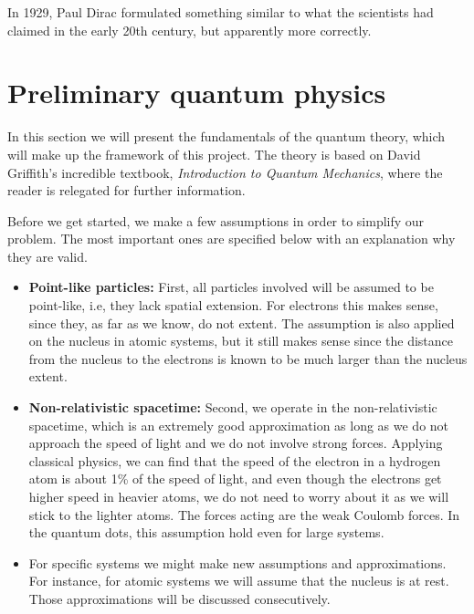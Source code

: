 In 1929, Paul Dirac formulated something similar to what the scientists had claimed in the early 20th century, but apparently more correctly. \cite{dirac_paul_adrien_maurice_quantum_1929}

\newpage
\section{Preliminary quantum physics} \label{sec:elementary}
In this section we will present the fundamentals of the quantum theory, which will make up the framework of this project. The theory is based on David Griffith's incredible textbook, \textit{Introduction to Quantum Mechanics}, where the reader is relegated for further information.

Before we get started, we make a few assumptions in order to simplify our problem. The most important ones are specified below with an explanation why they are valid.

\begin{itemize}
	\item \textbf{Point-like particles:} First, all particles involved will be assumed to be point-like, i.e, they lack spatial extension. For electrons this makes sense, since they, as far as we know, do not extent. The assumption is also applied on the nucleus in atomic systems, but it still makes sense since the distance from the nucleus to the electrons is known to be much larger than the nucleus extent.
	
	\item \textbf{Non-relativistic spacetime:}  Second, we operate in the non-relativistic spacetime, which is an extremely good approximation as long as we do not approach the speed of light and we do not involve strong forces. Applying classical physics, we can find that the speed of the electron in a hydrogen atom is about 1\% of the speed of light, and even though the electrons get higher speed in heavier atoms, we do not need to worry about it as we will stick to the lighter atoms. The forces acting are the weak Coulomb forces. In the quantum dots, this assumption hold even for large systems.
	
	\item For specific systems we might make new assumptions and approximations. For instance, for atomic systems we will assume that the nucleus is at rest. Those approximations will be discussed consecutively. 
\end{itemize}

